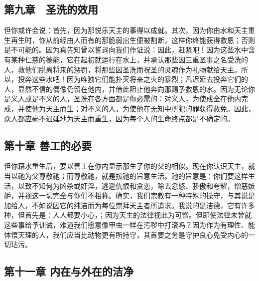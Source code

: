 
\subsection{第九章　圣洗的效用}

但你或许会说：首先，因为那悦乐天主的事得以成就。其次，因为你由水和天主重生再生时，你从前经由人而有的那脆弱出生便被割断，这样你终能获得救恩；否则是不可能的。因为真先知曾以誓词向我们作证说：因此，赶紧吧！因为这些水中含有某种仁慈的德能，它在起初就运行在水上，并承认那些因三重圣事之名受洗的人，救他们脱离将来的惩罚，将那些因圣洗而祝圣的灵魂作为礼物献给天主。所以，投奔这些水吧！因为唯独它们能扑灭将来之火的暴烈；凡迟延去投奔它们的人，显然不信的偶像仍留在他内，并借此阻止他奔向那赐予救恩的水。因为无论你是义人或是不义的人，圣洗在各方面都是你必需的：对义人，为使成全在他内完成，并使他为天主而生；对不义的人，为使他在无知中所犯的罪获得赦免。因此，众人都应毫不迟延地为天主而重生，因为每个人的生命终点都是不确定的。\par


\subsection{第十章  善工的必要}

但你藉水重生后，要以善工在你内显示那生了你的父的相似。现在你认识天主，就当以祂为父尊敬祂；而尊敬祂，就是按祂的旨意生活。祂的旨意是：你们要这样生活，以致不知何为凶杀或奸淫，逃避仇恨和贪恋，除去忿怒、骄傲和夸耀，憎恶嫉妒，并视这一切完全与你们不相称。确实，我们宗教有一种特殊的操守，与其说是加给人，不如说因它的纯洁而为每位崇拜天主者所追求。我说的是洁德，它有许多种，但首先是：人人都要小心，；因为天主的法律视此为可憎。但即使法律未曾就这些事给予训诫，难道我们愿意像甲虫一样在污秽中打滚吗？因为作为有理性、能体悟天理的人，我们应当比动物更有所持守，其首要之务是守护良心免受内心的一切玷污。\par


\subsection{第十一章  内在与外在的洁净}


